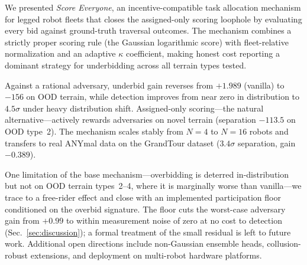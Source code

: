 \documentclass[letterpaper, 10pt, conference]{ieeeconf}
\begin{document}
We presented \emph{Score Everyone}, an incentive-compatible task allocation
mechanism for legged robot fleets that closes the assigned-only scoring loophole
by evaluating every bid against ground-truth traversal outcomes.  The mechanism
combines a strictly proper scoring rule (the Gaussian logarithmic score) with
fleet-relative normalization and an
adaptive $\kappa$ coefficient, making honest cost reporting a dominant strategy
for underbidding across all terrain types tested.

Against a rational adversary, underbid gain reverses from $+1.989$ (vanilla) to
$-156$ on OOD terrain, while detection improves from near zero in
distribution to $4.5\sigma$ under heavy distribution shift.  Assigned-only
scoring---the natural alternative---actively rewards adversaries on novel
terrain (separation $-113.5$ on OOD type~2).  The mechanism scales stably from
$N=4$ to $N=16$ robots and transfers to real ANYmal data on the GrandTour
dataset ($3.4\sigma$ separation, gain $-0.389$).

One limitation of the base mechanism---overbidding is deterred in-distribution
but not on OOD terrain types~2--4, where it is marginally worse than
vanilla---we trace to a free-rider effect and close with an implemented
participation floor conditioned on the overbid signature.  The floor cuts the
worst-case adversary gain from $+0.99$ to within measurement noise of zero at
no cost to detection (Sec.~\ref{sec:discussion}); a formal treatment of the
small residual is left to future work.  Additional open directions include
non-Gaussian ensemble heads, collusion-robust extensions, and deployment on
multi-robot hardware platforms.



\end{document}

